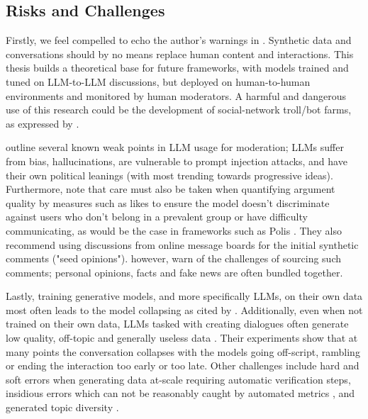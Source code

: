 
\subsection{Risks and Challenges}
\label{sec:related:challenges}

Firstly, we feel compelled to echo the author's warnings in \cite{small-polis-llm}. Synthetic data and conversations should by no means replace human content and interactions. This thesis builds a theoretical base for future frameworks, with models trained and tuned on LLM-to-LLM discussions, but deployed on human-to-human environments and monitored by human moderators. A harmful and dangerous use of this research could be the development of social-network troll/bot farms, as expressed by \cite{park2022socialsimulacracreatingpopulated}.

\cite{small-polis-llm} outline several known weak points in LLM usage for moderation; LLMs suffer from bias, hallucinations, are vulnerable to prompt injection attacks, and have their own political leanings (with most trending towards progressive ideas). Furthermore, \cite{vecchi-2021-towards} note that care must also be taken when quantifying argument quality by measures such as likes to ensure the model doesn't discriminate against users who don't belong in a prevalent group or have difficulty communicating, as would be the case in frameworks such as Polis \cite{small2021polis}. They also recommend using discussions from online message boards for the initial synthetic comments ("seed opinions"). \cite{vecchi-2021-towards} however, warn of the challenges of sourcing such comments; personal opinions, facts and fake news are often bundled together.

Lastly, training generative models, and more specifically LLMs, on their own data most often leads to the model collapsing \cite{alemohammad2023selfconsuminggenerativemodelsmad, shumailov2024curserecursiontraininggenerated} as cited by \cite{ulmer2024bootstrappingllmbasedtaskorienteddialogue}. Additionally, even when not trained on their own data, LLMs tasked with creating dialogues often generate low quality, off-topic and generally useless data \cite{ulmer2024bootstrappingllmbasedtaskorienteddialogue}. Their experiments show that at many points the conversation collapses with the models going off-script, rambling or ending the interaction too early or too late. Other challenges include hard and soft errors when generating data at-scale \cite{lambert2024selfdirectedsyntheticdialoguesrevisions, ulmer2024bootstrappingllmbasedtaskorienteddialogue} requiring automatic verification steps, insidious errors which can not be reasonably caught by automated metrics \cite{lambert2024selfdirectedsyntheticdialoguesrevisions, ulmer2024bootstrappingllmbasedtaskorienteddialogue}, and generated topic diversity \cite{lambert2024selfdirectedsyntheticdialoguesrevisions}.


